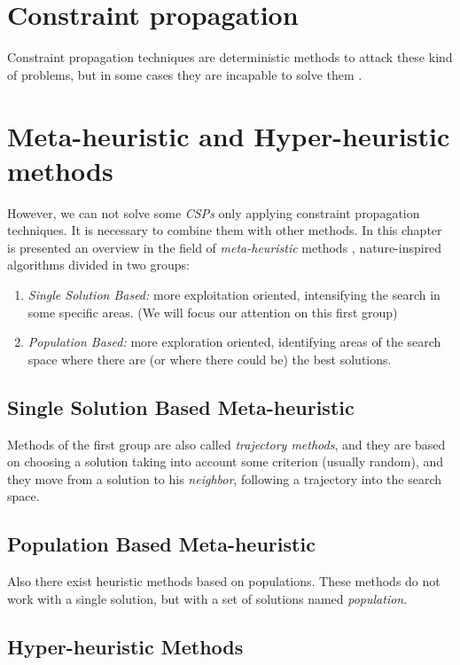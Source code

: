 \documentclass[a4paper]{book} %
\newcommand{\csp}{\textit{CSP}}
\newcommand{\csps}{\csp\textit{s}}
\begin{document}
\section{Constraint propagation}

Constraint propagation techniques are deterministic methods to attack these kind of problems, but in some cases they are incapable to solve them \cite{ChristianBessiere2006}. 

\section{Meta-heuristic and Hyper-heuristic methods}

However, we can not solve some \csps{} only applying constraint propagation techniques. It is necessary to combine them with other methods. In this chapter is presented an overview in the field of \textit{meta-heuristic} methods \cite{Boussaid2013}, nature-inspired algorithms divided in two groups: 
\begin{enumerate}
    \item {\it Single Solution Based:} more exploitation oriented, intensifying the search in some specific areas. (We will focus our attention on this first group)
    \item {\it Population Based:} more exploration oriented, identifying areas of the search space where there are (or where there could be) the best solutions.
\end{enumerate}

\subsection{Single Solution Based Meta-heuristic}

Methods of the first group are also called {\it trajectory methods}, and they are based on choosing a solution taking into account some criterion (usually random), and they move from a solution to his \textit{neighbor}, following a trajectory into the search space.

\subsection{Population Based Meta-heuristic}

Also there exist heuristic methods based on populations. These methods do not work with a single solution, but with a set of solutions named {\it population}. 

\subsection{Hyper-heuristic Methods}
\end{document}
